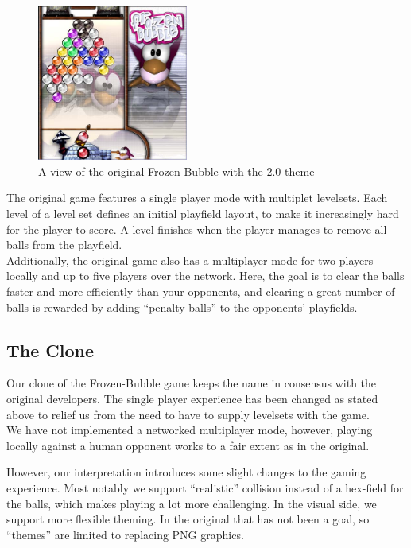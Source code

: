 \begin{figure}
\vspace{-2em}
  \begin{center}
    \includegraphics[width=0.44\textwidth]{images/screenshot1}
  \end{center}
  \vspace{-1em}
  \caption{A view of the original Frozen Bubble with the 2.0 theme}
\vspace{-2em}
\end{figure}

The original game features a single player mode with multiplet levelsets. Each level 
of a level set defines an initial playfield layout, to make it increasingly hard for 
the player to score. A level finishes when the player manages to remove all balls 
from the playfield.\\
Additionally, the original game also has a multiplayer mode for two players 
locally and up to five players over the network. Here, the goal is to clear the balls 
faster and more efficiently than your opponents, and clearing a great number of balls 
is rewarded by adding ``penalty balls'' to the opponents' playfields.
%
\subsection{The Clone}
Our clone of the Frozen-Bubble game keeps the name in consensus with the original developers.
The single player experience has been changed as stated above to relief us from the need 
to have to supply levelsets with the game.\\
We have not implemented a networked multiplayer mode, however, playing locally against 
a human opponent works to a fair extent as in the original.

However, our interpretation introduces some slight changes to the gaming experience.
Most notably we support ``realistic'' collision instead of a hex-field for the balls, which
makes playing a lot more challenging. In the visual side, we support more flexible theming.
In the original that has not been a goal, so ``themes'' are limited to replacing 
PNG graphics.
%
